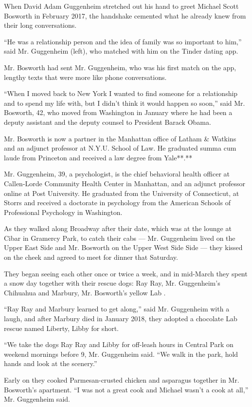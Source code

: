 When David Adam Guggenheim stretched out his hand to greet Michael Scott
Bosworth in February 2017, the handshake cemented what he already knew
from their long conversations.

``He was a relationship person and the idea of family was so important
to him,'' said Mr. Guggenheim (left), who matched with him on the Tinder
dating app.

Mr. Bosworth had sent Mr. Guggenheim, who was his first match on the
app, lengthy texts that were more like phone conversations.

``When I moved back to New York I wanted to find someone for a
relationship and to spend my life with, but I didn't think it would
happen so soon,'' said Mr. Bosworth, 42, who moved from Washington in
January where he had been a deputy assistant and the deputy counsel to
President Barack Obama.

Mr. Bosworth is now a partner in the Manhattan office of Latham \&
Watkins and an adjunct professor at N.Y.U. School of Law. He graduated
summa cum laude from Princeton and received a law degree from Yale**.**

Mr. Guggenheim, 39, a psychologist, is the chief behavioral health
officer at Callen-Lorde Community Health Center in Manhattan, and an
adjunct professor online at Post University. He graduated from the
University of Connecticut, at Storrs and received a doctorate in
psychology from the American Schools of Professional Psychology in
Washington.

As they walked along Broadway after their date, which was at the lounge
at Cibar in Gramercy Park, to catch their cabs --- Mr. Guggenheim lived
on the Upper East Side and Mr. Bosworth on the Upper West Side Side ---
they kissed on the cheek and agreed to meet for dinner that Saturday.

They began seeing each other once or twice a week, and in mid-March they
spent a snow day together with their rescue dogs: Ray Ray, Mr.
Guggenheim's Chihuahua and Marbury, Mr. Bosworth's yellow Lab .

``Ray Ray and Marbury learned to get along,'' said Mr. Guggenheim with a
laugh, and after Marbury died in January 2018, they adopted a chocolate
Lab rescue named Liberty, Libby for short.

``We take the dogs Ray Ray and Libby for off-leash hours in Central Park
on weekend mornings before 9, Mr. Guggenheim said. ``We walk in the
park, hold hands and look at the scenery.''

Early on they cooked Parmesan-crusted chicken and asparagus together in
Mr. Bosworth's apartment. ``I was not a great cook and Michael wasn't a
cook at all,'' Mr. Guggenheim said.

